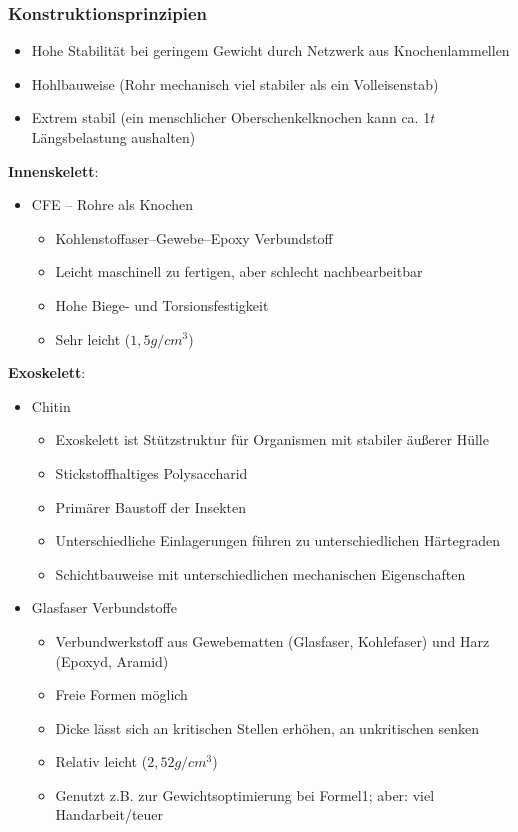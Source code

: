 \subsubsection{Konstruktionsprinzipien}
\begin{itemize}
	\item Hohe Stabilität bei geringem Gewicht durch Netzwerk aus Knochenlammellen
	\item Hohlbauweise (Rohr mechanisch viel stabiler als ein Volleisenstab)
	\item Extrem stabil (ein menschlicher Oberschenkelknochen kann ca. 1$t$ Längsbelastung aushalten)
\end{itemize}
\textbf{Innenskelett}:
\begin{itemize}
	\item CFE -- Rohre als Knochen
	\begin{itemize}
		\item Kohlenstoffaser--Gewebe--Epoxy Verbundstoff
		\item Leicht maschinell zu fertigen, aber schlecht nachbearbeitbar
		\item Hohe Biege- und Torsionsfestigkeit
		\item Sehr leicht ($1,5 g/cm^3$)
	\end{itemize}
\end{itemize}
\textbf{Exoskelett}:
\begin{itemize}
	\item Chitin
	\begin{itemize}
		\item Exoskelett ist Stützstruktur für Organismen mit stabiler äußerer Hülle
		\item Stickstoffhaltiges Polysaccharid
		\item Primärer Baustoff der Insekten
		\item Unterschiedliche Einlagerungen führen zu unterschiedlichen Härtegraden
		\item Schichtbauweise mit unterschiedlichen mechanischen Eigenschaften
	\end{itemize}
	\item Glasfaser Verbundstoffe
	\begin{itemize}
		\item Verbundwerkstoff aus Gewebematten (Glasfaser, Kohlefaser) und Harz (Epoxyd, Aramid)
		\item Freie Formen möglich
		\item Dicke lässt sich an kritischen Stellen erhöhen, an unkritischen senken
		\item Relativ leicht ($2,52 g/cm^3$)
		\item Genutzt z.B. zur Gewichtsoptimierung bei Formel1; aber: viel Handarbeit/teuer
	\end{itemize}
\end{itemize}

